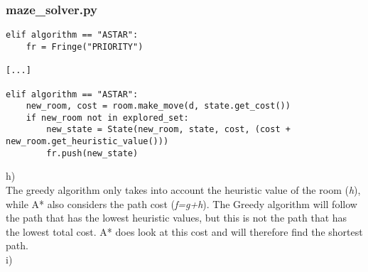 \documentclass{article}
\begin{document}
\subsubsection*{maze\_solver.py}
\begin{lstlisting}
elif algorithm == "ASTAR":
    fr = Fringe("PRIORITY")

[...]

elif algorithm == "ASTAR":
    new_room, cost = room.make_move(d, state.get_cost()) 
    if new_room not in explored_set:                              
        new_state = State(new_room, state, cost, (cost + new_room.get_heuristic_value()))    
        fr.push(new_state) 
\end{lstlisting}
h)
\\
The greedy algorithm only takes into account the heuristic value of the room (\emph{h}), while A* also considers the path cost (\emph{f=g+h}). The Greedy algorithm will follow the path that has the lowest heuristic values, but this is not the path that has the lowest total cost. A* does look at this cost and will therefore find the shortest path.
\\
i)
\\
\\
\end{document}
